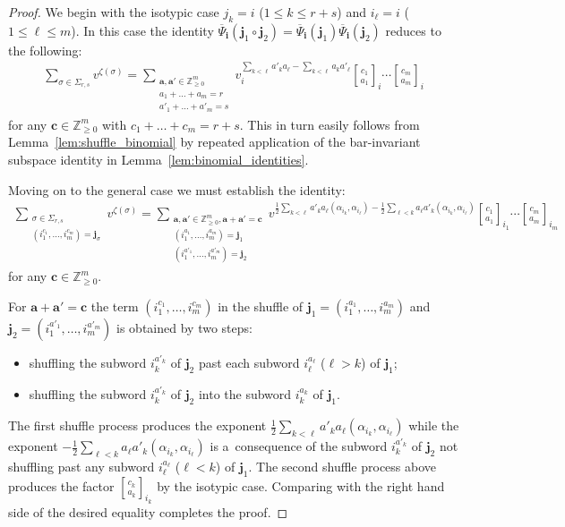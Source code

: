 \documentclass[pdftex]{sigma}
\numberwithin{equation}{section}
\begin{document}
\begin{proof}
We begin with the isotypic case $j_k=i$ ($1\le k\le r+s$) and $i_\ell=i$ ($1\le\ell\le m$).
In this case the identity
$\overline\Psi_\mathbf{i}(\mathbf{j}_1\circ\mathbf{j}_2)=\overline\Psi_\mathbf{i}(\mathbf{j}_1)\overline\Psi_\mathbf{i}(\mathbf{j}_2)$
reduces to the following:
\begin{gather*}
\sum\limits_{\sigma\in\Sigma_{r,s}}v^{\zeta(\sigma)}=\sum\limits_{\substack{\mathbf{a},\mathbf{a}'\in\mathbb{Z}_{\ge0}^m
\\
a_1+\dots+a_m=r
\\
a'_1+\dots+a'_m=s}}v_i^{\sum\limits_{k<\ell} a'_k a_\ell - \sum\limits_{k<\ell} a_k a'_\ell}{c_1\brack
a_1}_i\cdots{c_m\brack a_m}_i
\end{gather*}
for any $\mathbf{c}\in\mathbb{Z}_{\ge0}^m$ with $c_1+\dots+c_m=r+s$.
This in turn easily follows from Lemma~\ref{lem:shuffle_binomial} by repeated application of the bar-invariant subspace
identity in Lemma~\ref{lem:binomial_identities}.

Moving on to the general case we must establish the identity:
\begin{gather*}
\sum\limits_{\substack{\sigma\in\Sigma_{r,s}\\(i_1^{c_1},\ldots,i_m^{c_m})=\mathbf{j}_\sigma}}v^{\zeta(\sigma)}
=\sum\limits_{\substack{\mathbf{a},\mathbf{a}'\in\mathbb{Z}_{\ge0}^m,\mathbf{a}+\mathbf{a}'=\mathbf{c}\\
(i_1^{a_1},\ldots,i_m^{a_m})=\mathbf{j}_1\\(i_1^{a'_1},\ldots,i_m^{a'_m})=\mathbf{j}_2}}
v^{\frac{1}{2}
\sum\limits_{k<\ell} a'_k a_\ell(\alpha_{i_k},\alpha_{i_\ell})
-\frac{1}{2}\sum\limits_{\ell<k} a_\ell a'_k (\alpha_{i_k},\alpha_{i_\ell})}{c_1\brack a_1}_{i_1}\cdots{c_m\brack a_m}_{i_m}
\end{gather*}
for any $\mathbf{c}\in\mathbb{Z}_{\ge0}^m$.

For $\mathbf{a}+\mathbf{a}'=\mathbf{c}$ the term $(i_1^{c_1},\ldots,i_m^{c_m})$ in the shuf\/f\/le of
$\mathbf{j}_1=(i_1^{a_1},\ldots,i_m^{a_m})$ and $\mathbf{j}_2=(i_1^{a'_1},\ldots,i_m^{a'_m})$ is obtained by two steps:
\begin{itemize}\itemsep=0pt
\item shuf\/f\/ling the subword $i_k^{a'_k}$ of $\mathbf{j}_2$ past each subword $i_\ell^{a_\ell}$ ($\ell>k$) of
$\mathbf{j}_1$;
\item shuf\/f\/ling the subword $i_k^{a'_k}$ of $\mathbf{j}_2$ into the subword $i_k^{a_k}$ of $\mathbf{j}_1$.
\end{itemize}
The f\/irst shuf\/f\/le process produces
the exponent $\frac{1}{2}\sum\limits_{k<\ell} a'_k a_\ell (\alpha_{i_k},\alpha_{i_\ell})$ while the exponent\linebreak
$-\frac{1}{2}\sum\limits_{\ell<k} a_\ell a'_k(\alpha_{i_k},\alpha_{i_\ell})$
is a~consequence of the subword $i_k^{a'_k}$ of $\mathbf{j}_2$ not shuf\/f\/ling past any subword $i_\ell^{a_\ell}$ ($\ell<k$) of $\mathbf{j}_1$.
The second shuf\/f\/le process above produces the factor ${c_k\brack a_k}_{i_k}$ by the isotypic case.
Comparing with the right hand side of the desired equality completes the proof.
\end{proof}
\end{document}
